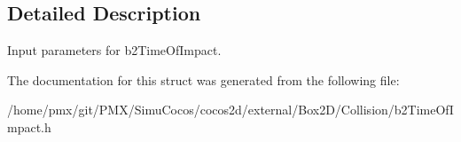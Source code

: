\subsection{Detailed Description}
Input parameters for b2\+Time\+Of\+Impact. 

The documentation for this struct was generated from the following file\+:\begin{DoxyCompactItemize}
\item 
/home/pmx/git/\+P\+M\+X/\+Simu\+Cocos/cocos2d/external/\+Box2\+D/\+Collision/b2\+Time\+Of\+Impact.\+h\end{DoxyCompactItemize}
